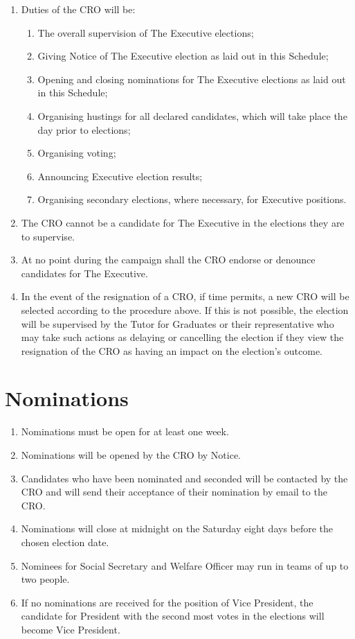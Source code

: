 \documentclass[11pt, a4paper]{article}
\begin{document}
\begin{enumerate}
	\item Duties of the CRO will be:
    	\begin{enumerate}
        	\item The overall supervision of The Executive elections;
            \item Giving Notice of The Executive election as laid out in this Schedule;
            \item Opening and closing nominations for The Executive elections as laid out in this Schedule;
            \item Organising hustings for all declared candidates, which will take place the day prior to elections;
            \item Organising voting;
            \item Announcing Executive election results;
            \item Organising secondary elections, where necessary, for Executive positions.
        \end{enumerate}
    \item The CRO cannot be a candidate for The Executive in the elections they are to supervise.
    \item At no point during the campaign shall the CRO endorse or denounce candidates for The Executive.
    \item In the event of the resignation of a CRO, if time permits, a new CRO will be selected according to the procedure above. If this is not possible, the  election will be supervised by the Tutor for Graduates or their representative who may take such actions as delaying or cancelling the election if they view the resignation of the CRO as having an impact on the election's outcome.
\end{enumerate}





\section{Nominations}
\label{sec:nominations}

\begin{enumerate}
	\item Nominations must be open for at least one week.
    \item Nominations will be opened by the CRO  by Notice.
    \item Candidates who have been nominated and seconded will be contacted by the CRO and will send their acceptance of their nomination by email to the CRO.
    \item Nominations will close at midnight on the Saturday eight days before the chosen election date.
    \item Nominees for Social Secretary and Welfare Officer may run in teams of up to two people.
    \item If no nominations are received for the position of Vice President, the candidate for President with the second most votes in the elections will become Vice President.
\end{enumerate}
\end{document}
